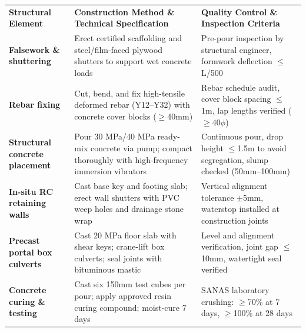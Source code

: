 \documentclass[a4paper,11pt]{article}
\begin{document}
{\fontsize{7.7pt}{9.8pt}\selectfont
\renewcommand{\arraystretch}{1.23}
\noindent
\begin{tabularx}{\textwidth}{@{}p{3.3cm} p{6.6cm} X@{}}
\rowcolor{mhnavy}
{\color{white}\bfseries Structural Element} & {\color{white}\bfseries Construction Method \& Technical Specification} & {\color{white}\bfseries Quality Control \& Inspection Criteria} \\
\rowcolor{mhbluelight}
\bfseries Falsework \& shuttering & Erect certified scaffolding and steel/film-faced plywood shutters to support wet concrete loads & Pre-pour inspection by structural engineer, formwork deflection $\le$ L/500 \\
\bfseries Rebar fixing & Cut, bend, and fix high-tensile deformed rebar (Y12--Y32) with concrete cover blocks ($\ge$40mm) & Rebar schedule audit, cover block spacing $\le$1m, lap lengths verified ($\ge$40$\phi$) \\
\rowcolor{mhbluelight}
\bfseries Structural concrete placement & Pour 30 MPa/40 MPa ready-mix concrete via pump; compact thoroughly with high-frequency immersion vibrators & Continuous pour, drop height $\le$1.5m to avoid segregation, slump checked (50mm--100mm) \\
\bfseries In-situ RC retaining walls & Cast base key and footing slab; erect wall shutters with PVC weep holes and drainage stone wrap & Vertical alignment tolerance $\pm$5mm, waterstop installed at construction joints \\
\rowcolor{mhbluelight}
\bfseries Precast portal box culverts & Cast 20 MPa floor slab with shear keys; crane-lift box culverts; seal joints with bituminous mastic & Level and alignment verification, joint gap $\le$10mm, watertight seal verified \\
\bfseries Concrete curing \& testing & Cast six 150mm test cubes per pour; apply approved resin curing compound; moist-cure 7 days & SANAS laboratory crushing: $\ge$70\% at 7 days, $\ge$100\% at 28 days \\
\end{tabularx}
\renewcommand{\arraystretch}{1}
}

\vfill
\end{document}
